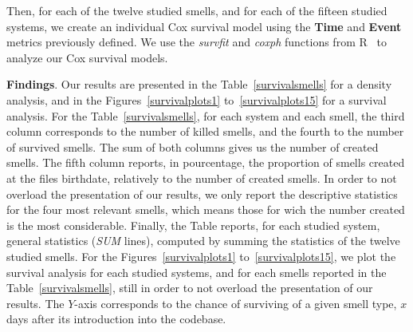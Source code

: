 {Then, for each of the twelve studied smells, and for each of the fifteen studied systems, we create an individual Cox survival model using the \textbf{Time} and \textbf{Event} metrics previously defined. We use the \textsl{survfit} and \textsl{coxph} functions from R~\cite{rPackage} to analyze our Cox survival models.

\textbf{Findings}. Our results are presented in the Table~\ref{survivalsmells} for a density analysis, and in the Figures~\ref{survivalplots1} to~\ref{survivalplots15} for a survival analysis. 
For the Table~\ref{survivalsmells}, for each system and each smell, the third column corresponds to the number of killed smells, and the fourth to the number of survived smells. The sum of both columns gives us the number of created smells. The fifth column reports, in pourcentage, the proportion of smells created at the files birthdate, relatively to the number of created smells. In order to not overload the presentation of our results, we only report the descriptive statistics for the four most relevant smells, which means those for wich the number created is the most considerable. Finally, the Table reports, for each studied system, general statistics (\textsl{SUM} lines), computed by summing the statistics of the twelve studied smells.
For the Figures~\ref{survivalplots1} to~\ref{survivalplots15}, we plot the survival analysis for each studied systems, and for each smells reported in the Table~\ref{survivalsmells}, still in order to not overload the presentation of our results. The $Y$-axis corresponds to the chance of surviving of a given smell type, $x$ days after its introduction into the codebase.
}
